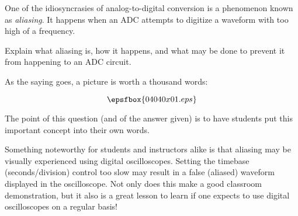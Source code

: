 

One of the idiosyncrasies of analog-to-digital conversion is a phenomenon known as {\it aliasing}.  It happens when an ADC attempts to digitize a waveform with too high of a frequency.  

Explain what aliasing is, how it happens, and what may be done to prevent it from happening to an ADC circuit.







As the saying goes, a picture is worth a thousand words:

$$\epsfbox{04040x01.eps}$$







The point of this question (and of the answer given) is to have students put this important concept into their own words.

Something noteworthy for students and instructors alike is that aliasing may be visually experienced using digital oscilloscopes.  Setting the timebase (seconds/division) control too slow may result in a false (aliased) waveform displayed in the oscilloscope.  Not only does this make a good classroom demonstration, but it also is a great lesson to learn if one expects to use digital oscilloscopes on a regular basis!




